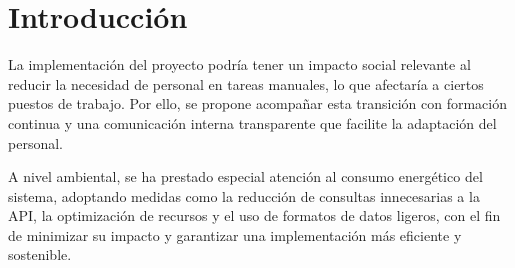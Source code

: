 
\section{Introducción}
La implementación del proyecto podría tener un impacto social relevante al reducir la necesidad de personal en
tareas manuales, lo que afectaría a ciertos puestos de trabajo.
Por ello, se propone acompañar esta transición con formación continua y una comunicación interna transparente que
facilite la adaptación del personal.

A nivel ambiental, se ha prestado especial atención al consumo energético del sistema, adoptando medidas como la
reducción de consultas innecesarias a la API, la optimización de recursos y el uso de formatos de datos ligeros, con
el fin de minimizar su impacto y garantizar una implementación más eficiente y sostenible.
